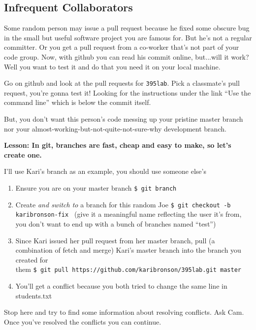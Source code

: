 \documentclass[letterpaper]{article}
\begin{document}
\subsection*{Infrequent Collaborators}

Some random person may issue a pull request because he fixed some obscure bug in the small but useful software project you are famous for.   But he's not a regular committer.  Or you get a pull request from a co-worker that's not part of your code group.  Now, with github you can read his commit online, but...will it work?  Well you want to test it and do that you need it on your local machine.

Go on github and look at the pull requests for {\tt 395lab}.  Pick a classmate's pull request, you're gonna test it!  Looking for the instructions under the link ``Use the command line'' which is below the commit itself.

But, you don't want this person's code messing up your pristine master branch nor your almost-working-but-not-quite-not-sure-why development branch.

\vspace{\baselineskip}
{\bf Lesson: In git, branches are fast, cheap and easy to make, so let's create one.}
\vspace{\baselineskip}

I'll use Kari's branch as an example, you should use someone else's

\begin{enumerate}
\item Ensure you are on your master branch \verb+$ git branch +
\item Create {\it and switch to} a branch for this random Joe \verb+$ git checkout -b karibronson-fix + (give it a meaningful name reflecting the user it's from, you don't want to end up with a bunch of branches named ``test'')
\item Since Kari issued her pull request from her master branch,
pull (a combination of fetch and merge) Kari's master branch into the branch you created for \\ them \verb+$ git pull https://github.com/karibronson/395lab.git master +
\item You'll get a conflict because you both tried to change the same line in students.txt
\end{enumerate}

Stop here and try to find some information about resolving conflicts.  Ask Cam.  Once you've resolved the conflicts you can continue.
\end{document}
